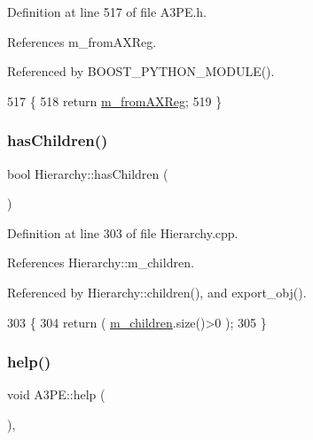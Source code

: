 Definition at line 517 of file A3\+P\+E.\+h.



References m\+\_\+from\+A\+X\+Reg.



Referenced by B\+O\+O\+S\+T\+\_\+\+P\+Y\+T\+H\+O\+N\+\_\+\+M\+O\+D\+U\+L\+E().


\begin{DoxyCode}
517                        \{
518     \textcolor{keywordflow}{return} \hyperlink{classA3PE_acbfe708ac0a81243959c96124f192b9e}{m\_fromAXReg};
519   \}
\end{DoxyCode}
\mbox{\label{classHierarchy_a255174fe4d316d2a3f430dcb9dab29f1}} 
\subsubsection{\texorpdfstring{has\+Children()}{hasChildren()}}
{\footnotesize\ttfamily bool Hierarchy\+::has\+Children (\begin{DoxyParamCaption}{ }\end{DoxyParamCaption})\hspace{0.3cm}{\ttfamily [inherited]}}



Definition at line 303 of file Hierarchy.\+cpp.



References Hierarchy\+::m\+\_\+children.



Referenced by Hierarchy\+::children(), and export\+\_\+obj().


\begin{DoxyCode}
303                               \{
304   \textcolor{keywordflow}{return} ( \hyperlink{classHierarchy_a038816763941fd4a930504917f60483b}{m\_children}.size()>0 );
305 \}
\end{DoxyCode}
\mbox{\label{classA3PE_ae495a413cc26d31321b31942ebef1bfa}} 
\subsubsection{\texorpdfstring{help()}{help()}}
{\footnotesize\ttfamily void A3\+P\+E\+::help (\begin{DoxyParamCaption}{ }\end{DoxyParamCaption})\hspace{0.3cm}{\ttfamily [inline]}, {\ttfamily [virtual]}}

